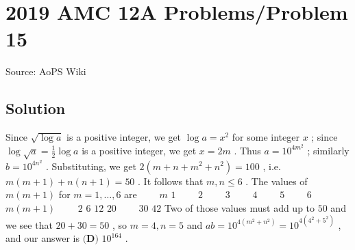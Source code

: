 \documentclass[12pt]{article}
\begin{document}
\section*{{2019 AMC 12A Problems/Problem 15}}
Source: AoPS Wiki

\subsection*{Solution}
Since $\sqrt{\log{a}}$ is a positive integer, we get $\log a = x^2$ for some integer $x$ ; since $\log \sqrt{a} = \tfrac 12 \log a$ is a positive integer, we get $x=2m$ . Thus $a=10^{4m^2}$ ; similarly $b=10^{4n^2}$ . Substituting, we get $2(m+n+m^2+n^2)=100$ , i.e. $m(m+1) + n(n+1) = 50$ . It follows that $m,n \le 6$ . The values of $m(m+1)$ for $m=1,\ldots , 6$ are $\qquad m$ $1\qquad$ $2\qquad$ $3\qquad$ $4\qquad$ $5\qquad$ $6\qquad$ $m(m+1)\qquad$ $2$ $6$ $12$ $20\qquad$ $30$ $42$ Two of those values must add up to $50$ and we see that $20+30=50$ , so $m=4, n=5$ and $ab=10^{4(m^2+n^2)}=10^{4(4^2+5^2)}$ , and our answer is $\boxed{\textbf{(D) } 10^{164}}$ .
\end{document}
